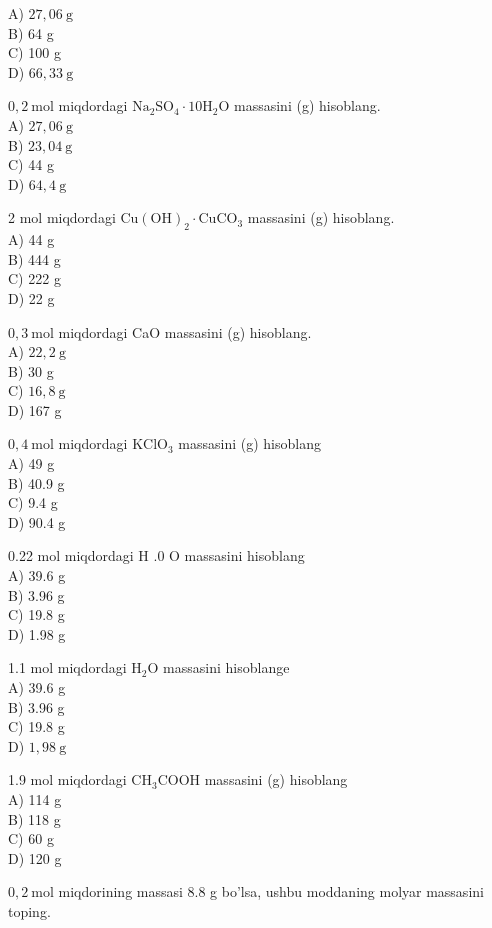 A) $27,06 \mathrm{~g}$\\
B) 64 g\\
C) 100 g\\
D) $66,33 \mathrm{~g}$
  \item $0,2 \mathrm{~mol}$ miqdordagi $\mathrm{Na}_{2} \mathrm{SO}_{4} \cdot 10 \mathrm{H}_{2} \mathrm{O}$ massasini (g) hisoblang.\\
A) $27,06 \mathrm{~g}$\\
B) $23,04 \mathrm{~g}$\\
C) 44 g\\
D) $64,4 \mathrm{~g}$
  \item 2 mol miqdordagi $\mathrm{Cu}(\mathrm{OH})_{2} \cdot \mathrm{CuCO}_{3}$ massasini (g) hisoblang.\\
A) 44 g\\
B) 444 g\\
C) 222 g\\
D) 22 g
  \item $0,3 \mathrm{~mol}$ miqdordagi CaO massasini (g) hisoblang.\\
A) $22,2 \mathrm{~g}$\\
B) 30 g\\
C) $16,8 \mathrm{~g}$\\
D) 167 g
  \item $0,4 \mathrm{~mol}$ miqdordagi $\mathrm{KClO}_{3}$ massasini (g) hisoblang\\
A) 49 g\\
B) 40.9 g\\
C) 9.4 g\\
D) 90.4 g
  \item 0.22 mol miqdordagi H .0 O massasini hisoblang\\
A) 39.6 g\\
B) 3.96 g\\
C) 19.8 g\\
D) 1.98 g
  \item 1.1 mol miqdordagi $\mathrm{H}_{2} \mathrm{O}$ massasini hisoblange\\
A) 39.6 g\\
B) 3.96 g\\
C) 19.8 g\\
D) $1,98 \mathrm{~g}$
  \item 1.9 mol miqdordagi $\mathrm{CH}_{3} \mathrm{COOH}$ massasini (g) hisoblang\\
A) 114 g\\
B) 118 g\\
C) 60 g\\
D) 120 g
  \item $0,2 \mathrm{~mol}$ miqdorining massasi 8.8 g bo'lsa, ushbu moddaning molyar massasini toping.\\
